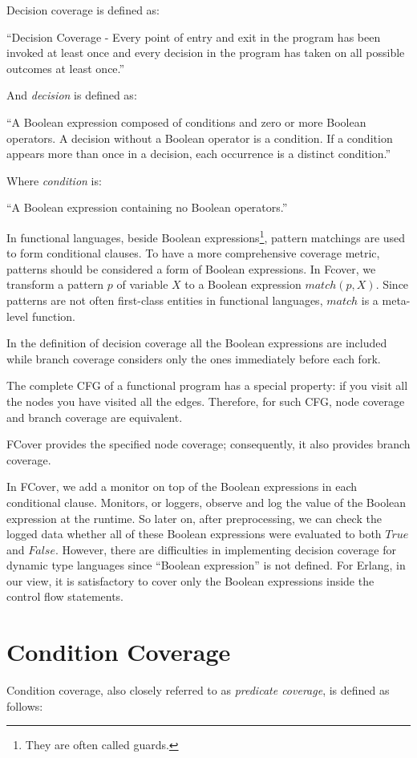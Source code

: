 \documentclass[12pt,a4paper]{report}
\begin{document}
Decision coverage is defined as:

``Decision Coverage - Every point of entry and exit in the program has been invoked at least once and every decision in the program has taken on all possible outcomes at least once.''\cite{cast-10}

And \emph{decision} is defined as:

``A Boolean expression composed of conditions and zero or more Boolean operators. A decision without a Boolean operator is a condition. If a condition appears more than once in a decision, each occurrence is a distinct condition.''\cite{cast-10}

Where \emph{condition} is:

``A Boolean expression containing no Boolean operators.''\cite{cast-10}

In functional languages, beside Boolean expressions\footnote{They are often called guards.}, pattern matchings are used to form conditional clauses. To have a more comprehensive coverage metric, patterns should be considered a form of Boolean expressions. In Fcover, we transform a pattern $p$ of variable $X$ to a Boolean expression $match(p,X)$. Since patterns are not often first-class entities in functional languages, $match$ is a meta-level function.

In the definition of decision coverage all the Boolean expressions are included while branch coverage considers only the ones immediately before each fork.

The complete CFG of a functional program has a special property: if you visit all the nodes you have visited all the edges. Therefore, for such CFG, node coverage and branch coverage are equivalent. 

FCover provides the specified node coverage; consequently, it also provides branch coverage.

In FCover, we add a monitor on top of the Boolean expressions in each conditional clause. Monitors, or loggers, observe and log the value of the Boolean expression at the runtime. So later on, after preprocessing, we can check the logged data whether all of these Boolean expressions were evaluated to both $True$ and $False$. However, there are difficulties in implementing decision coverage for dynamic type languages since ``Boolean expression'' is not defined. For Erlang, in our view, it is satisfactory to cover only the Boolean expressions inside the control flow statements.

 
\section{Condition Coverage}
Condition coverage, also closely referred to as \emph{predicate coverage}, is defined as follows:
\end{document}
